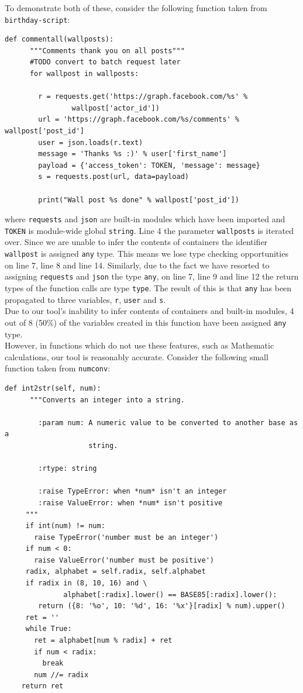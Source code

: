 \documentclass[12pt, titlepage]{article}
\begin{document}
To demonstrate both of these, consider the following function taken from \texttt{birthday-script}:
\begin{lstlisting}[mathescape]
    def commentall(wallposts):
      """Comments thank you on all posts"""
      #TODO convert to batch request later
      for wallpost in wallposts:

        r = requests.get('https://graph.facebook.com/%s' %
                wallpost['actor_id'])
        url = 'https://graph.facebook.com/%s/comments' % wallpost['post_id']
        user = json.loads(r.text)
        message = 'Thanks %s :)' % user['first_name']
        payload = {'access_token': TOKEN, 'message': message}
        s = requests.post(url, data=payload)

        print("Wall post %s done" % wallpost['post_id'])
\end{lstlisting}
where \texttt{requests} and \texttt{json} are built-in modules which have been imported and \texttt{TOKEN} is module-wide global \texttt{string}. Line 4 the parameter \texttt{wallposts} is iterated over. Since we are unable to infer the contents of containers the identifier \texttt{wallpost} is assigned \texttt{any} type. This means we lose type checking opportunities on line 7, line 8 and line 14. Similarly, due to the fact we have resorted to assigning \texttt{requests} and \texttt{json} the type \texttt{any}, on line 7, line 9 and line 12 the return types of the function calls are type \texttt{type}. The result of this is that \texttt{any} has been propagated to three variables, \texttt{r}, \texttt{user} and \texttt{s}. \\
\indent Due to our tool's inability to infer contents of containers and built-in modules, 4 out of 8 (50\%) of the variables created in this function have been assigned \texttt{any} type. \\
\indent However, in functions which do not use these features, such as Mathematic calculations, our tool is reasonably accurate. Consider the following small function taken from \texttt{numconv}:
\begin{lstlisting}[mathescape]
    def int2str(self, num):
      """Converts an integer into a string.

        :param num: A numeric value to be converted to another base as a
                    string.

        :rtype: string

        :raise TypeError: when *num* isn't an integer
        :raise ValueError: when *num* isn't positive
     """
     if int(num) != num:
       raise TypeError('number must be an integer')
     if num < 0:
       raise ValueError('number must be positive')
     radix, alphabet = self.radix, self.alphabet
     if radix in (8, 10, 16) and \
              alphabet[:radix].lower() == BASE85[:radix].lower():
        return ({8: '%o', 10: '%d', 16: '%x'}[radix] % num).upper()
     ret = ''
     while True:
       ret = alphabet[num % radix] + ret
       if num < radix:
         break
       num //= radix
    return ret
\end{lstlisting}
\end{document}
